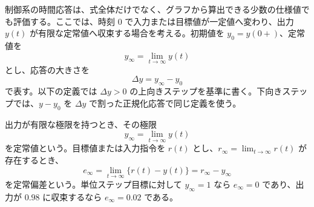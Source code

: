 制御系の時間応答は、式全体だけでなく、グラフから算出できる少数の仕様値でも評価する。ここでは、時刻 $0$ で入力または目標値が一定値へ変わり、出力 $y(t)$ が有限な定常値へ収束する場合を考える。初期値を $y_0=y(0+)$、定常値を
\begin{equation}
  y_\infty=\lim_{t\to\infty}y(t)
\end{equation}
とし、応答の大きさを
\begin{equation}
  \Delta y=y_\infty-y_0
\end{equation}
で表す。以下の定義では $\Delta y>0$ の上向きステップを基準に書く。下向きステップでは、$y-y_0$ を $\Delta y$ で割った正規化応答で同じ定義を使う。

\begin{definition}[定常値と定常偏差]
出力が有限な極限を持つとき、その極限
\begin{equation}
  y_\infty=\lim_{t\to\infty}y(t)
\end{equation}
を定常値という。目標値または入力指令を $r(t)$ とし、$r_\infty=\lim_{t\to\infty}r(t)$ が存在するとき、
\begin{equation}
  e_\infty=\lim_{t\to\infty}\{r(t)-y(t)\}=r_\infty-y_\infty
  \label{eq:steady-state-error}
\end{equation}
を定常偏差という。単位ステップ目標に対して $y_\infty=1$ なら $e_\infty=0$ であり、出力が $0.98$ に収束するなら $e_\infty=0.02$ である。
\end{definition}

